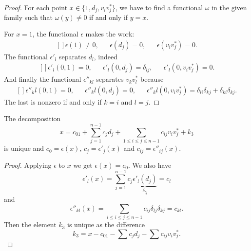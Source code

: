 \begin{proof}
    For each point $x\in\{ 1,d_j,v_iv_j^* \}$, we have to find a functional $\omega$ in the given family such that $\omega(y)\neq 0$ if and only if $y=x$.

    For $x=1$, the functional $\epsilon$ makes the work:
    \begin{equation}
        \begin{aligned}[]
            \epsilon(1)\neq 0,&&\epsilon(d_j)=0,&&\epsilon(v_iv_j^*)=0.
        \end{aligned}
    \end{equation}
    The functional $\epsilon'_l$ separates $d_l$, indeed
    \begin{equation}
        \begin{aligned}[]
            \epsilon'_l(0,1)=0,&&\epsilon'_l(0,d_j)=\delta_{lj},&&\epsilon'_l(0,v_iv_j^*)=0.
        \end{aligned}
    \end{equation}
    And finally the functional $\epsilon''_{kl}$ separates $v_kv_l^*$ because
    \begin{equation}
        \begin{aligned}[]
            \epsilon''_kl(0,1)=0,&&\epsilon''_kl(0,d_j)=0,&&\epsilon''_kl(0,v_iv_j^*)=\delta_{li}\delta_{kj}+\delta_{ki}\delta_{kj}.
        \end{aligned}
    \end{equation}
    The last is nonzero if and only if $k=i$ and $l=j$.
\end{proof}


\begin{proposition}     \label{PropDecompxczepsApp}
    The decomposition
    \begin{equation}
        x=c_01+\sum_{j=1}^{n-1}c_jd_j+\sum_{1\leq i\leq j\leq n-1}c_{ij}v_iv_j^*+k_3
    \end{equation}
    is unique and $c_0=\epsilon(x)$, $c_j=\epsilon'_j(x)$ and $c_{ij}=\epsilon''_{ij}(x)$.
\end{proposition}

\begin{proof}
    Applying $\epsilon$ to $x$ we get $\epsilon(x)=c_0$. We also have
    \begin{equation}
        \epsilon'_l(x)=\sum_{j=1}^{n-1}c_j\underbrace{\epsilon'_l(d_j)}_{\delta_{lj}}=c_l
    \end{equation}
    and
    \begin{equation}
        \epsilon''_{kl}(x)=\sum_{i\leq i\leq j\leq n-1}c_{ij}\delta_{lj}\delta_{kj}=c_{kl}.
    \end{equation}
    Then the element $k_3$ is unique as the difference
    \begin{equation}
        k_3=x-c_01-\sum c_jd_j-\sum c_{ij}v_iv_j^*.
    \end{equation}
\end{proof}

